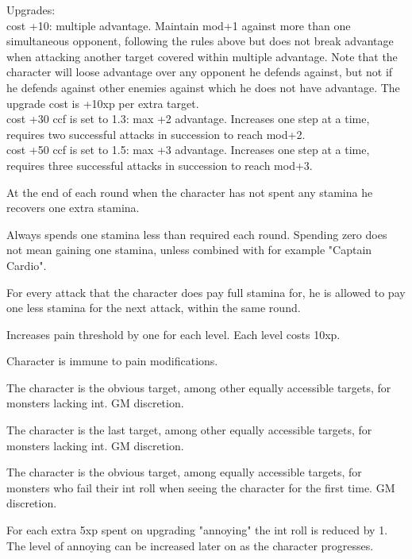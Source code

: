 Upgrades: \\
cost +10: multiple advantage. Maintain mod+1 against more than one simultaneous opponent, following the rules above but does not break advantage when attacking another target covered within multiple advantage. Note that the character will loose advantage over any opponent he defends against, but not if he defends against other enemies against which he does not have advantage. The upgrade cost is +10xp per extra target. \\
cost +30 ccf is set to 1.3: max +2 advantage. Increases one step at a time, requires two successful attacks in succession to reach mod+2. \\
cost +50 ccf is set to 1.5: max +3 advantage. Increases one step at a time, requires three successful attacks in succession to reach mod+3.


 At the end of each round when the character has not spent any stamina he recovers one extra stamina.


 Always spends one stamina less than required each round. Spending zero does not mean gaining one stamina, unless combined with for example "Captain Cardio".


 For every attack that the character does pay full stamina for, he is allowed to pay one less stamina for the next attack, within the same round.


 Increases pain threshold by one for each level. Each level costs 10xp.


 Character is immune to pain modifications.


 The character is the obvious target, among other equally accessible targets, for monsters lacking int. GM discretion.


 The character is the last target, among other equally accessible targets, for monsters lacking int. GM discretion.


 The character is the obvious target, among equally accessible targets, for monsters who fail their int roll when seeing the character for the first time. GM discretion.

For each extra 5xp spent on upgrading "annoying" the int roll is reduced by 1. The level of annoying can be increased later on as the character progresses.


